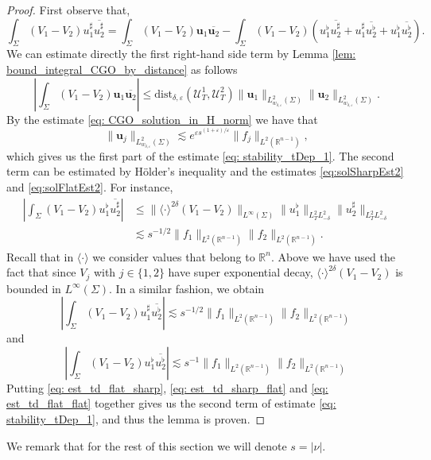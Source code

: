 \documentclass[10pt,a4paper]{amsart}
\theoremstyle{remark}
\theoremstyle{definition}
\newcommand{\R}{\mathbb{R}}
\newcommand{\dist}{\mathrm{dist}}
\def\ve{\varepsilon}
\def\lec{\lesssim}
\def\cal{\mathcal}
\def\ovl{\overline}
\begin{document}
\begin{proof}
	First observe that,
	\[
	\int_{\Sigma} (V_1-V_2)u^\sharp_1\ovl{u^\sharp_2}=\int_{\Sigma} (V_1-V_2) \mathbf{u}_1\ovl{\mathbf{u}_2}-\int_{\Sigma} (V_1-V_2)(u^\flat_1\ovl{u^\sharp_2}+u^\sharp_1\ovl{u^\flat_2}+u^\flat_1\ovl{u^\flat_2}).
	\]
	We can estimate directly the first right-hand side term by Lemma \ref{lem: bound_integral_CGO_by_distance} as follows 
	\[
	\left|\int_{\Sigma} (V_1-V_2)\mathbf{u}_1\ovl{\mathbf{u}_2}\right| 
	\leq 
	\dist_{\delta,\ve}(\cal{U}_T^1, \cal{U}_T^2) \|\mathbf{u}_1\|_{L^2_{w_{\delta, \ve}}(\Sigma)} \|\mathbf{u}_2\|_{L^2_{w_{\delta, \ve}}(\Sigma)}.
	\]
	By the estimate \eqref{eq: CGO_solution_in_H_norm} we have that
	\[
	\|\mathbf{u}_j\|_{L^2_{w_{\delta, \ve}}(\Sigma)} \lec e^{\ve s^{(1+\ve)/\ve}} \|f_j\|_{L^2(\R^{n-1})},
	\]
	which gives us the first part of the estimate \eqref{eq: stability_tDep_1}. The second term can be estimated by H\"older's inequality and the estimates \eqref{eq:solSharpEst2} and \eqref{eq:solFlatEst2}.
	For instance,
	\begin{equation}\label{eq: est_td_flat_sharp}
	\begin{aligned}
		\left| \int_{\Sigma} (V_1-V_2)u^\flat_1\ovl{u^\sharp_2}\right| &\leq \|\langle \cdot \rangle^{2\delta}(V_1-V_2)\|_{L^\infty(\Sigma)} \|u^\flat_1\|_{L^2_TL^2_{-\delta}} \|u^\sharp_2\|_{L^2_TL^2_{-\delta}} \\
		&\lec s^{-1/2}\|f_1\|_{L^2(\R^{n-1})}\|f_2\|_{L^2(\R^{n-1})}.
	\end{aligned}
	\end{equation}
	Recall that in $\langle \cdot \rangle$ we consider values that belong to $\R^n$. Above we have used the fact that since $V_j$ with $j\in\{1, 2\}$ have super exponential decay, $\langle \cdot \rangle^{2\delta}(V_1-V_2)$ is bounded in $L^\infty(\Sigma)$. In a similar fashion, we obtain 
	\begin{equation}\label{eq: est_td_sharp_flat}
		\left| \int_{\Sigma} (V_1-V_2)u^\sharp_1\ovl{u^\flat_2}\right|\lec s^{-1/2}\|f_1\|_{L^2(\R^{n-1})}\|f_2\|_{L^2(\R^{n-1})}
	\end{equation}
	and
	\begin{equation}\label{eq: est_td_flat_flat}
		\left| \int_{\Sigma} (V_1-V_2)u^\flat_1\ovl{u^\flat_2}\right|\lec s^{-1}\|f_1\|_{L^2(\R^{n-1})}\|f_2\|_{L^2(\R^{n-1})}
	\end{equation}
	Putting \eqref{eq: est_td_flat_sharp}, \eqref{eq: est_td_sharp_flat} and \eqref{eq: est_td_flat_flat} together gives us the second term of estimate \eqref{eq: stability_tDep_1}, and thus the lemma is proven.
\end{proof}
%
We remark that for the rest of this section we will denote  $s=|\nu|$.
\end{document}
